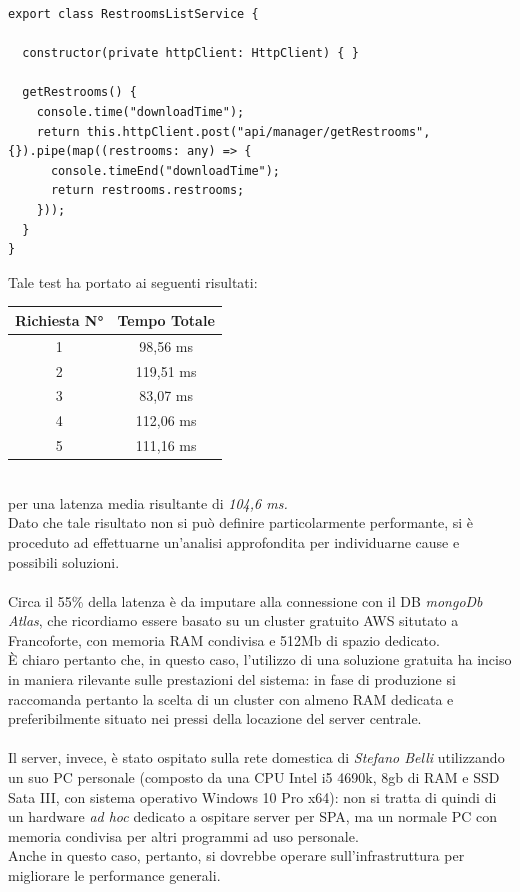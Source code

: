 \documentclass[12pt]{article}
\begin{document}
\begin{lstlisting}
export class RestroomsListService {

  constructor(private httpClient: HttpClient) { }

  getRestrooms() {
    console.time("downloadTime");
    return this.httpClient.post("api/manager/getRestrooms", {}).pipe(map((restrooms: any) => {
      console.timeEnd("downloadTime");
      return restrooms.restrooms;
    }));
  }
}
\end{lstlisting}
Tale test ha portato ai seguenti risultati:
\begin{table}[h]
\begin{tabular}{|c|c|}
\hline
\textbf{Richiesta N°} & \textbf{Tempo Totale}  \\ \hline
1 & 98,56 ms  \\ \hline
2 & 119,51 ms \\ \hline
3 & 83,07 ms  \\ \hline
4 & 112,06 ms \\ \hline
5 & 111,16 ms \\ \hline
\end{tabular}
\end{table}\\
per una latenza media risultante di \textit{104,6 ms.}\\
Dato che tale risultato non si può definire particolarmente performante, si è proceduto ad effettuarne un'analisi approfondita per individuarne cause e possibili soluzioni.\\\\
Circa il 55\% della latenza è da imputare alla connessione con il DB \textit{mongoDb Atlas}, che ricordiamo essere basato su un cluster gratuito AWS situtato a Francoforte, con memoria RAM condivisa e 512Mb di spazio dedicato.\\
È chiaro pertanto che, in questo caso, l'utilizzo di una soluzione gratuita ha inciso in maniera rilevante sulle prestazioni del sistema: in fase di produzione si raccomanda pertanto la scelta di un cluster con almeno RAM dedicata e preferibilmente situato nei pressi della locazione del server centrale.\\\\
Il server, invece, è stato ospitato sulla rete domestica di \textit{Stefano Belli} utilizzando un suo PC personale (composto da una CPU Intel i5 4690k, 8gb di RAM e SSD Sata III, con sistema operativo  Windows 10 Pro x64): non si tratta di quindi di un hardware \textit{ad hoc} dedicato a ospitare server per SPA, ma un normale PC con memoria condivisa per altri programmi ad uso personale.\\Anche in questo caso, pertanto, si dovrebbe operare sull'infrastruttura per migliorare le performance generali.\\\\
\end{document}
